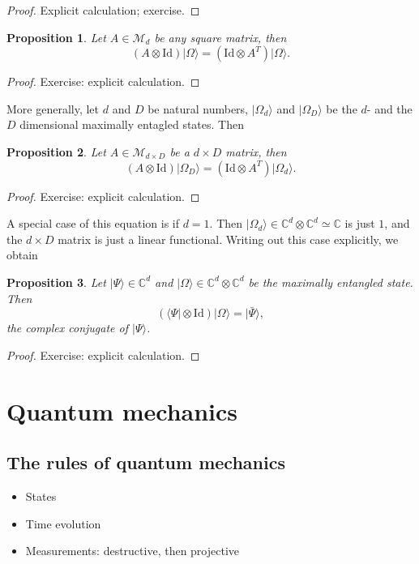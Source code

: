 \documentclass{article}
\newtheorem{proposition}{Proposition}
\theoremstyle{definition}
\newcommand{\id}{\mathrm{Id}}
\newcommand{\ket}[1]{\vert #1 \rangle}
\newcommand{\bra}[1]{\langle #1 \vert}
\begin{document}
\begin{proof}
  Explicit calculation; exercise.
\end{proof}

\begin{proposition}\label{prop:max_ent_pull_through}
  Let $A\in\mathcal{M}_d$ be any square matrix, then 
  \begin{equation*}
     (A \otimes \id) \ket{\Omega} = (\id\otimes A^T) \ket{\Omega}.
  \end{equation*}
\end{proposition}
\begin{proof}
   Exercise: explicit calculation.
\end{proof}
More generally, let $d$ and $D$ be natural numbers, $\ket{\Omega_d}$ and $\ket{\Omega_D}$ be the $d$- and the $D$ dimensional maximally entagled states. Then
\begin{proposition}
  Let $A\in\mathcal{M}_{d\times D}$ be a $d\times D$ matrix, then 
  \begin{equation*}
    (A \otimes \id) \ket{\Omega_D} = (\id\otimes A^T) \ket{\Omega_d}.
  \end{equation*}
\end{proposition}
\begin{proof}
  Exercise: explicit calculation.
\end{proof}
A special case of this equation is if $d=1$. Then $\ket{\Omega_d} \in \mathbb{C}^d\otimes \mathbb{C}^d \simeq \mathbb{C}$ is just $1$, and the $d\times D$ matrix is just a linear functional. Writing out this case explicitly, we obtain 
\begin{proposition}\label{prop:max_ent_pull_through_lin_fcn}
  Let $\ket{\Psi}\in\mathbb{C}^{d}$ and $\ket{\Omega}\in \mathbb{C}^d \otimes \mathbb{C}^d$ be the maximally entangled state. Then 
  \begin{equation*}
    (\bra{\Psi} \otimes \id) \ket{\Omega} = \ket{\bar{\Psi}},
  \end{equation*}
  the complex conjugate of $\ket{\Psi}$.
\end{proposition}
\begin{proof}
  Exercise: explicit calculation.
\end{proof}


\section{Quantum mechanics}

\subsection{The rules of quantum mechanics}
 \begin{itemize}
   \item States
   \item Time evolution
   \item Measurements: destructive, then projective
 \end{itemize}
 
\end{document}
